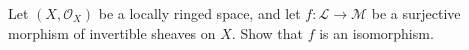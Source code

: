 Let $(X, \mathcal{O}_X)$ be a locally ringed space, and let $f: \mathcal{L} \to \mathcal{M}$ be a surjective morphism of invertible sheaves on $X$. Show that $f$ is an isomorphism.
